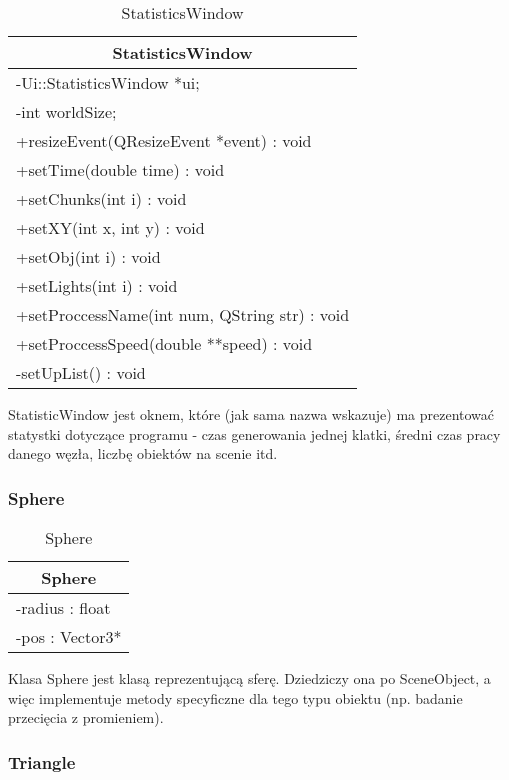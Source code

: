 \footnotesize
\begin{longtable}{|p{14cm}|}
    \caption{StatisticsWindow} \label{tab:StatisticsWindow} \\ \hline
    \multicolumn{1}{|c|}{StatisticsWindow} \\ \hline
    -Ui::StatisticsWindow *ui; \\
    -int worldSize; \\
    \hline
	+resizeEvent(QResizeEvent *event) : void \\
    +setTime(double time) : void  \\
    +setChunks(int i) : void \\
    +setXY(int x, int y) : void \\
    +setObj(int i) : void \\
    +setLights(int i) : void  \\
    +setProccessName(int num, QString str) : void \\
    +setProccessSpeed(double **speed) : void \\
    -setUpList() : void \\
    \hline
\end{longtable}
\normalsize

StatisticWindow jest oknem, które (jak sama nazwa wskazuje) ma prezentować statystki dotyczące programu - czas generowania jednej klatki, średni czas pracy danego węzła, liczbę obiektów na scenie itd.

\subsubsection{Sphere}

\footnotesize
\begin{longtable}{|p{14cm}|}
    \caption{Sphere} \label{tab:Sphere} \\ \hline
    \multicolumn{1}{|c|}{Sphere} \\ \hline
    -radius : float \\
    -pos : Vector3* \\
    \hline
\end{longtable}
\normalsize

Klasa Sphere jest klasą reprezentującą sferę. Dziedziczy ona po SceneObject, a więc implementuje metody specyficzne dla tego typu obiektu (np. badanie przecięcia z promieniem).

\subsubsection{Triangle}

